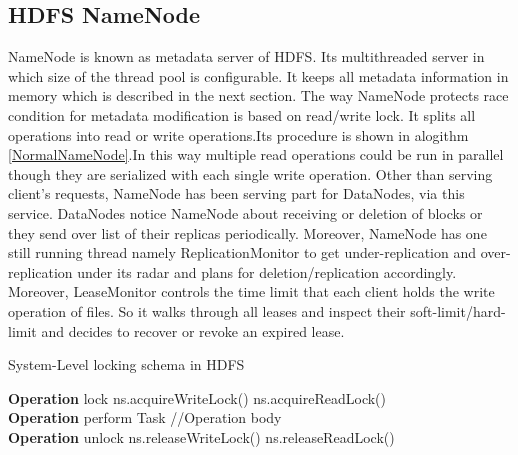 \subsection{HDFS NameNode}
NameNode  is   known  as   metadata  server  of  HDFS. Its  multithreaded server in which size of
the  thread  pool  is   configurable.  It  keeps   all  metadata  information  in  memory   which  is
described  in  the  next  section.  The  way   NameNode  protects   race  condition  for  metadata
modification  is   based  on  read/write  lock.  It  splits   all  operations   into  read  or  write  operations.Its procedure is shown in alogithm \ref{NormalNameNode}.In this way multiple read operations could be run in parallel though they are serialized with
each single write operation.
Other  than  serving  client’s   requests,  NameNode  has   been  serving  part  for  DataNodes,  via
this   service. DataNodes  notice NameNode about receiving or deletion of blocks  or they  send
over  list  of  their  replicas   periodically.  Moreover,  NameNode  has   one  still running  thread
namely   ReplicationMonitor  to  get  under-replication  and  over-replication  under  its   radar  and
plans for deletion/replication accordingly.
Moreover,  LeaseMonitor  controls   the  time  limit  that  each  client  holds   the  write  operation  of files.  So  it  walks   through  all  leases   and  inspect  their  soft-limit/hard-limit  and  decides   to
recover or revoke an expired lease.

\begin{algorithm}[h]
\caption{System-Level locking schema in HDFS}
\label{NormalNameNode}
\begin{algorithmic}
\State \textbf{Operation } lock
\State ns.acquireWriteLock()
\Else
\State ns.acquireReadLock()
\EndIf\\
\State \textbf{Operation }  perform Task
 \State //Operation body \\
\State \textbf{Operation } unlock
\State ns.releaseWriteLock()
\Else
\State ns.releaseReadLock()
\EndIf
 

\end{algorithmic}
\end{algorithm}

